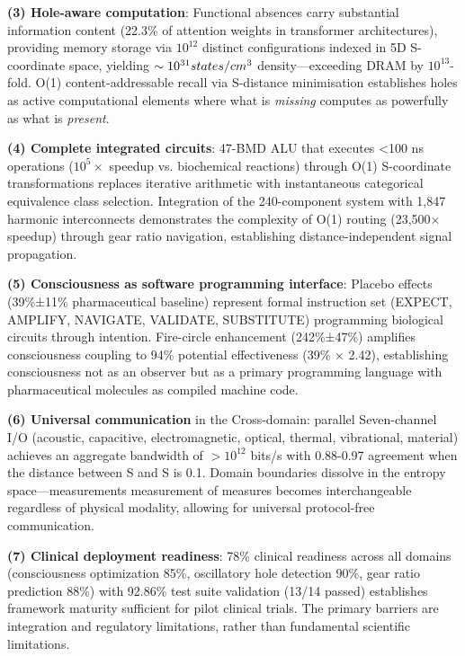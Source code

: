 \documentclass{article}
\theoremstyle{definition}
\theoremstyle{remark}
\begin{document}
\textbf{(3) Hole-aware computation}: Functional absences carry substantial information content (22.3\% of attention weights in transformer architectures), providing memory storage via $10^{12}$ distinct configurations indexed in 5D S-coordinate space, yielding $\sim 10^{31} states/cm\textsuperscript{3}$ density—exceeding DRAM by $10^{13}$-fold. O(1) content-addressable recall via S-distance minimisation establishes holes as active computational elements where what is \textit{missing} computes as powerfully as what is \textit{present}.

\textbf{(4) Complete integrated circuits}: 47-BMD ALU that executes <100 ns operations ($10^{5}\times$ speedup vs. biochemical reactions) through O(1) S-coordinate transformations replaces iterative arithmetic with instantaneous categorical equivalence class selection. Integration of the 240-component system with 1,847 harmonic interconnects demonstrates the complexity of O(1) routing (23,500× speedup) through gear ratio navigation, establishing distance-independent signal propagation.

\textbf{(5) Consciousness as software programming interface}: Placebo effects (39\%±11\% pharmaceutical baseline) represent formal instruction set (EXPECT, AMPLIFY, NAVIGATE, VALIDATE, SUBSTITUTE) programming biological circuits through intention. Fire-circle enhancement (242\%±47\%) amplifies consciousness coupling to 94\% potential effectiveness (39\% × 2.42), establishing consciousness not as an observer but as a primary programming language with pharmaceutical molecules as compiled machine code.

\textbf{(6) Universal communication} in the Cross-domain: parallel Seven-channel I/O (acoustic, capacitive, electromagnetic, optical, thermal, vibrational, material) achieves an aggregate bandwidth of $>10^{12}$ bits/s with 0.88-0.97 agreement when the distance between S and S is 0.1. Domain boundaries dissolve in the entropy space—measurements measurement of measures becomes interchangeable regardless of physical modality, allowing for universal protocol-free communication.

\textbf{(7) Clinical deployment readiness}: 78\% clinical readiness across all domains (consciousness optimization 85\%, oscillatory hole detection 90\%, gear ratio prediction 88\%) with 92.86\% test suite validation (13/14 passed) establishes framework maturity sufficient for pilot clinical trials. The primary barriers are integration and regulatory limitations, rather than fundamental scientific limitations.
\end{document}

